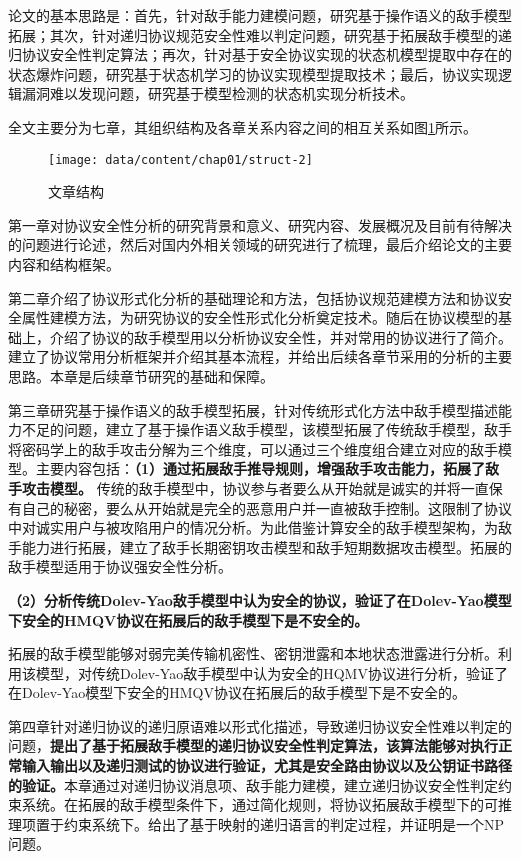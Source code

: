 论文的基本思路是：首先，针对敌手能力建模问题，研究基于操作语义的敌手模型拓展；其次，针对递归协议规范安全性难以判定问题，研究基于拓展敌手模型的递归协议安全性判定算法；再次，针对基于安全协议实现的状态机模型提取中存在的状态爆炸问题，研究基于状态机学习的协议实现模型提取技术；最后，协议实现逻辑漏洞难以发现问题，研究基于模型检测的状态机实现分析技术。

全文主要分为七章，其组织结构及各章关系内容之间的相互关系如图\ref{fig-struct}所示。

\begin{figure}[htp]\centering\texttt{[image: data/content/chap01/struct-2]}
\caption{文章结构}
\label{fig-struct}
\end{figure}

第一章对协议安全性分析的研究背景和意义、研究内容、发展概况及目前有待解决的问题进行论述，然后对国内外相关领域的研究进行了梳理，最后介绍论文的主要内容和结构框架。

第二章介绍了协议形式化分析的基础理论和方法，包括协议规范建模方法和协议安全属性建模方法，为研究协议的安全性形式化分析奠定技术。随后在协议模型的基础上，介绍了协议的敌手模型用以分析协议安全性，并对常用的协议进行了简介。建立了协议常用分析框架并介绍其基本流程，并给出后续各章节采用的分析的主要思路。本章是后续章节研究的基础和保障。

第三章研究基于操作语义的敌手模型拓展，针对传统形式化方法中敌手模型描述能力不足的问题，建立了基于操作语义敌手模型，该模型拓展了传统敌手模型，敌手将密码学上的敌手攻击分解为三个维度，可以通过三个维度组合建立对应的敌手模型。主要内容包括：\textbf{（1）通过拓展敌手推导规则，增强敌手攻击能力，拓展了敌手攻击模型。
}
传统的敌手模型中，协议参与者要么从开始就是诚实的并将一直保有自己的秘密，要么从开始就是完全的恶意用户并一直被敌手控制。这限制了协议中对诚实用户与被攻陷用户的情况分析。为此借鉴计算安全的敌手模型架构，为敌手能力进行拓展，建立了敌手长期密钥攻击模型和敌手短期数据攻击模型。拓展的敌手模型适用于协议强安全性分析。

\textbf{（2）分析传统Dolev-Yao敌手模型中认为安全的协议，验证了在Dolev-Yao模型下安全的HMQV协议在拓展后的敌手模型下是不安全的。}

拓展的敌手模型能够对弱完美传输机密性、密钥泄露和本地状态泄露进行分析。利用该模型，对传统Dolev-Yao敌手模型中认为安全的HQMV协议进行分析，验证了在Dolev-Yao模型下安全的HMQV协议在拓展后的敌手模型下是不安全的。

第四章针对递归协议的递归原语难以形式化描述，导致递归协议安全性难以判定的问题，\textbf{提出了基于拓展敌手模型的递归协议安全性判定算法，该算法能够对执行正常输入输出以及递归测试的协议进行验证，尤其是安全路由协议以及公钥证书路径的验证。}本章通过对递归协议消息项、敌手能力建模，建立递归协议安全性判定约束系统。在拓展的敌手模型条件下，通过简化规则，将协议拓展敌手模型下的可推理项置于约束系统下。给出了基于映射的递归语言的判定过程，并证明是一个NP问题。

